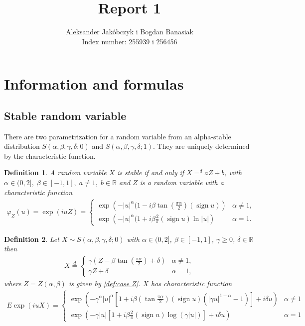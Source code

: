 \documentclass{article}
\title{Report 1}
\author{Aleksander Jakóbczyk i Bogdan Banasiak\\ 
	Index number: 255939 i 256456}
\date{}\date{}
\newtheorem{definition}{Definition}
\DeclareMathOperator{\sign}{sign}
\begin{document}
	
	\maketitle
	\section{Information and formulas}
		\subsection*{Stable random variable}
		There are two parametrization for a random variable from an alpha-stable distribution $S(\alpha, \beta , \gamma, \delta; 0)$ and $S(\alpha, \beta , \gamma, \delta; 1)$.
		They are uniquely determined by the characteristic function.
		\begin{definition} A random variable $X$ is stable if and only if $X=^d aZ +b$, with \\$\alpha \in (0,2],\;\beta\in [-1,1],\; a\ne1,\; b\in\mathbb{R}$ and $Z$ is a random variable with a characteristic function  
			\begin{gather*}
				\varphi_Z(u) = \exp(i u Z) =
				\begin{cases}\label{def:case Z}
					\exp\left(- |u|^\alpha(1-i\beta\tan(\frac{\pi\alpha}{2})(\sign u)  \right) &\alpha \ne 1,\\
					\exp\left(- |u|^\alpha(1+i\beta\frac{2}{\pi}(\sign u)\ln|u|  \right) &\alpha = 1.
				\end{cases}
			\end{gather*}
		\end{definition}
		\begin{definition} Let $X \sim S(\alpha, \beta , \gamma, \delta; 0)$ with $\alpha \in (0,2]$, $\beta \in [-1,1]$, $\gamma \ge 0$, $\delta\in\mathbb{R}$ then  
			\begin{gather*}
				X \stackrel{d}{=} 
				\begin{cases}
					\gamma (Z- \beta\tan(\frac{\pi\alpha}{2})+\delta)& \alpha\ne1,\\
					\gamma Z + \delta& \alpha=1,
				\end{cases}
			\end{gather*}
			where $Z = Z(\alpha,\beta)$ is given by \ref{def:case Z}. $X$ has characteristic function
			\begin{gather*}
				E \exp (i u X)= \begin{cases}
					\exp \left(-\gamma^\alpha|u|^\alpha\left[1+i \beta\left(\tan \frac{\pi \alpha}{2}\right)(\operatorname{sign} u)\left(|\gamma u|^{1-\alpha}-1\right)\right]+i \delta u\right) & \alpha \neq 1 \\ \exp \left(-\gamma|u|\left[1+i \beta \frac{2}{\pi}(\operatorname{sign} u) \log (\gamma|u|)\right]+i \delta u\right) & \alpha=1
				\end{cases}
			\end{gather*}
		\end{definition}
\end{document}
